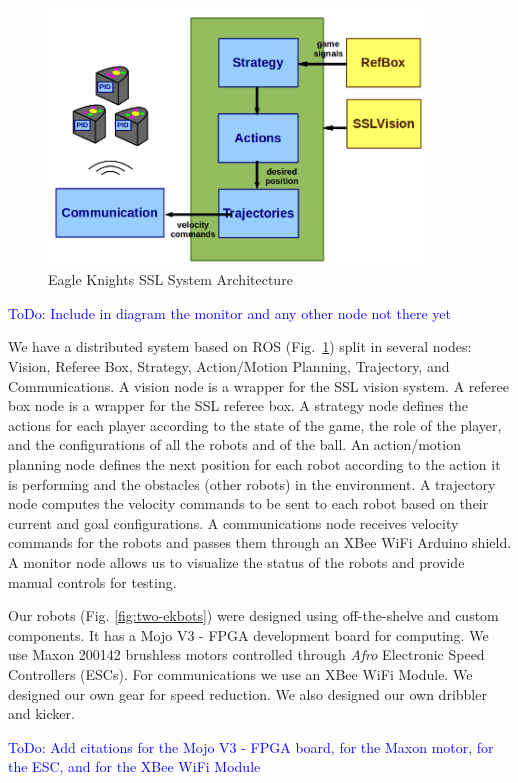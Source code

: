 \documentclass[]{llncs}
\newcommand{\TODO}[1]{{\textcolor{blue}{ToDo: {#1}}}}
\begin{document}
\begin{figure}[htb]
	\centering
	\includegraphics[width=10cm]{./pictures/eagle_knights_architecture.png}
	\caption{Eagle Knights SSL System Architecture}
	\label{fig:eagle-knights-architecture}  
\end{figure}

\TODO{Include in diagram the monitor and any other node not there yet}

We have a distributed system based on ROS (Fig.~\ref{fig:eagle-knights-architecture}) split in several nodes: Vision, Referee Box, Strategy, Action/Motion Planning, Trajectory, and Communications. A vision node is a wrapper for the SSL vision system. A referee box node is a wrapper for the SSL referee box. A strategy node defines the actions for each player  according to the state of the game, the role of the player, and the configurations of all the robots and of the ball. An action/motion planning node defines the next position for each robot according to the action it is performing and the obstacles (other robots) in the environment. A trajectory node computes the velocity commands to be sent to each robot based on their current and goal configurations. A communications node receives velocity commands for the robots and passes them through an XBee WiFi Arduino shield. A monitor node allows us to visualize the status of the robots and provide manual controls for testing.


Our robots (Fig. \ref{fig:two-ekbots}) were designed using
off-the-shelve and custom components. It has a Mojo V3 - FPGA development board for computing. We use Maxon 200142 brushless motors controlled through \emph{Afro} Electronic Speed Controllers (ESCs). For communications we use an XBee WiFi Module. We designed our own gear for speed reduction. We also designed our own dribbler and kicker. 

\TODO{Add citations for the Mojo V3 - FPGA board, for the Maxon motor, for the ESC, and for the XBee WiFi Module}
\end{document}
